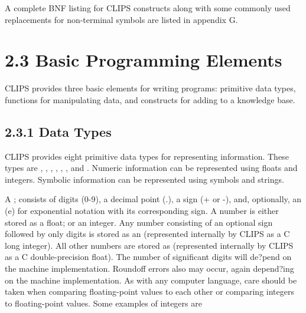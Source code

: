\documentclass[letterpaper,10pt,english]{sphinxmanual}
\begin{document}
A complete BNF listing for CLIPS constructs along with some commonly
used replacements for non-terminal symbols are listed in appendix G.


\section{2.3 Basic Programming Elements}
\label{\detokenize{overview:basic-programming-elements}}
CLIPS provides three basic elements for writing programs: primitive data
types, functions for manipulating data, and constructs for adding to a
knowledge base.


\subsection{2.3.1 Data Types}
\label{\detokenize{overview:data-types}}
CLIPS provides eight primitive data types for representing information.
These types are , , , ,
, ,  and
. Numeric information can be represented using
floats and integers. Symbolic information can be represented using
symbols and strings.

A ; consists  of digits (0-9), a decimal point
(.), a sign (+ or -), and, optionally, an (e) for exponential notation
with its corresponding sign. A number is either stored as a float; or an
integer. Any number consisting of an optional sign followed by only
digits is stored as an  (represented internally by CLIPS as a
C long integer). All other numbers are stored as  (represented
internally by CLIPS as a C double-precision float). The number of
significant digits will de?pend on the machine implementation. Roundoff
errors also may occur, again depend?ing on the machine implementation.
As with any computer language, care should be taken when comparing
floating-point values to each other or comparing integers to
floating-point values. Some examples of integers are

\begin{sphinxVerbatim}[commandchars=\\\{\}]
   
\end{sphinxVerbatim}
\end{document}
